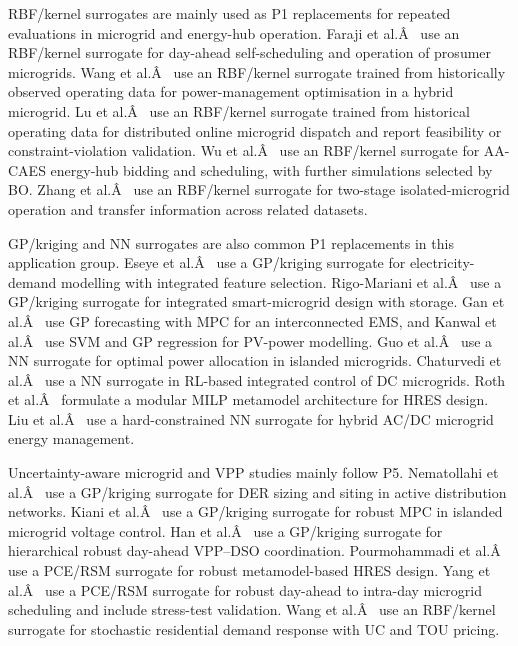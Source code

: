 RBF/kernel surrogates are mainly used as P1 replacements for repeated
evaluations in microgrid and energy-hub operation. Faraji et
al.Â~\cite{Faraji2020157284} use an RBF/kernel surrogate for day-ahead
self-scheduling and operation of prosumer microgrids. Wang et
al.Â~\cite{Wang20192635} use an RBF/kernel surrogate trained from
historically observed operating data for power-management optimisation
in a hybrid microgrid. Lu et al.Â~\cite{Lu20232989} use an RBF/kernel
surrogate trained from historical operating data for distributed online
microgrid dispatch and report feasibility or constraint-violation
validation. Wu et al.Â~\cite{Wu2021} use an RBF/kernel surrogate for AA-CAES
energy-hub bidding and scheduling, with further simulations selected by
BO. Zhang et al.Â~\cite{Zhang20203731} use an RBF/kernel surrogate for
two-stage isolated-microgrid operation and transfer information across
related datasets.

GP/kriging and NN surrogates are also common P1 replacements in this
application group. Eseye et al.Â~\cite{Eseye201991463} use a GP/kriging
surrogate for electricity-demand modelling with integrated feature
selection. Rigo-Mariani et al.Â~\cite{Rigo-Mariani20171762} use a GP/kriging
surrogate for integrated smart-microgrid design with storage. Gan et
al.Â~\cite{Gan2021695} use GP forecasting with MPC for an interconnected EMS,
and Kanwal et al.Â~\cite{Kanwal2018117} use SVM and GP regression for
PV-power modelling. Guo et al.Â~\cite{Guo20222057} use a NN surrogate for
optimal power allocation in islanded microgrids. Chaturvedi et
al.Â~\cite{Chaturvedi2024149} use a NN surrogate in RL-based integrated
control of DC microgrids. Roth et al.Â~\cite{Roth2019214} formulate a
modular MILP metamodel architecture for HRES design. Liu et
al.Â~\cite{Liu20242534} use a
hard-constrained NN surrogate for hybrid AC/DC microgrid energy
management.

Uncertainty-aware microgrid and VPP studies mainly follow P5.
Nematollahi et al.Â~\cite{Nematollahi2021} use a GP/kriging surrogate for DER
sizing and siting in active distribution networks. Kiani et
al.Â~\cite{Kiani20253021} use a GP/kriging surrogate for robust MPC in
islanded microgrid voltage control. Han et al.Â~\cite{Han2024} use a
GP/kriging surrogate for hierarchical robust day-ahead VPP--DSO
coordination. Pourmohammadi et al.Â~\cite{Pourmohammadi2023} use a PCE/RSM
surrogate for robust metamodel-based HRES design. Yang et
al.Â~\cite{Yang2024__2} use a PCE/RSM surrogate for robust day-ahead to
intra-day microgrid scheduling and include stress-test validation. Wang
et al.Â~\cite{Wang20211767} use an RBF/kernel surrogate for stochastic
residential demand response with UC and TOU pricing.

